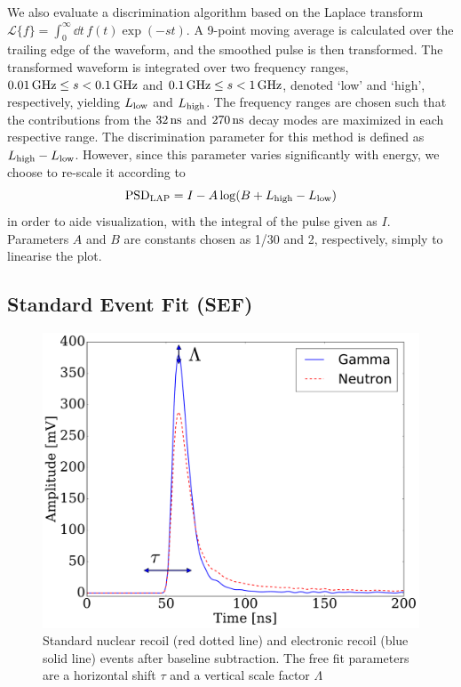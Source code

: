 We also evaluate a discrimination algorithm based on the Laplace transform $\mathcal{L}\{f\} = \int_0^{\infty} \dd t\,f(t)\exp(-st)$. A 9-point moving average is calculated over the trailing edge of the waveform, and the smoothed pulse is then transformed. The transformed waveform is integrated over two frequency ranges, $0.01\,\mathrm{GHz}\leq s<0.1\,\mathrm{GHz}$ and $0.1\,\mathrm{GHz}\leq s<1\,\mathrm{GHz}$, denoted `low' and `high', respectively, yielding $L_{\mathrm{low}}$ and $L_{\mathrm{high}}$. The frequency ranges are chosen such that the contributions from the $32\,\mathrm{ns}$ and $270\,\mathrm{ns}$ decay modes are maximized in each respective range. The discrimination parameter for this method is defined as $L_{\mathrm{high}}-L_{\mathrm{low}}$. However, since this parameter varies significantly with energy, we choose to re-scale it according to
\begin{equation}
\mathrm{PSD}_{\mathrm{LAP}} = I- A \log(B + L_{\mathrm{high}} - L_{\mathrm{low}})
\end{equation}
in order to aide visualization, with the integral of the pulse given as $I$. Parameters $A$ and $B$ are constants chosen as 1/30 and 2, respectively, simply to linearise the plot.

\subsection{Standard Event Fit (SEF)}

\begin{figure}[htbp]
\centering
    \includegraphics[width=\columnwidth]{figures/psd/fig_standardevents}
    \caption{Standard nuclear recoil (red dotted line) and electronic recoil (blue solid line) events after baseline subtraction. The free fit parameters are a horizontal shift $\tau$ and a vertical scale factor $\Lambda$}\label{fig:stdevents}
\end{figure}

